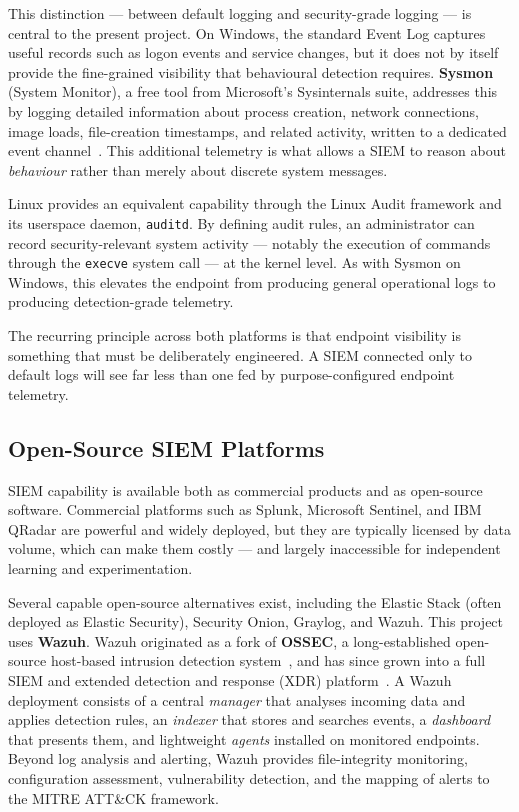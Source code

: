 This distinction --- between default logging and security-grade logging --- is
central to the present project. On Windows, the standard Event Log captures
useful records such as logon events and service changes, but it does not by
itself provide the fine-grained visibility that behavioural detection
requires. \textbf{Sysmon} (System Monitor), a free tool from Microsoft's
Sysinternals suite, addresses this by logging detailed information about
process creation, network connections, image loads, file-creation timestamps,
and related activity, written to a dedicated event channel~\cite{sysmon}. This
additional telemetry is what allows a SIEM to reason about \textit{behaviour}
rather than merely about discrete system messages.

Linux provides an equivalent capability through the Linux Audit framework and
its userspace daemon, \texttt{auditd}. By defining audit rules, an
administrator can record security-relevant system activity --- notably the
execution of commands through the \texttt{execve} system call --- at the
kernel level. As with Sysmon on Windows, this elevates the endpoint from
producing general operational logs to producing detection-grade telemetry.

The recurring principle across both platforms is that endpoint visibility is
something that must be deliberately engineered. A SIEM connected only to
default logs will see far less than one fed by purpose-configured endpoint
telemetry.

\subsection{Open-Source SIEM Platforms}

SIEM capability is available both as commercial products and as open-source
software. Commercial platforms such as Splunk, Microsoft Sentinel, and IBM
QRadar are powerful and widely deployed, but they are typically licensed by
data volume, which can make them costly --- and largely inaccessible for
independent learning and experimentation.

Several capable open-source alternatives exist, including the Elastic Stack
(often deployed as Elastic Security), Security Onion, Graylog, and Wazuh. This
project uses \textbf{Wazuh}. Wazuh originated as a fork of
\textbf{OSSEC}, a long-established open-source host-based intrusion detection
system~\cite{ossec}, and has since grown into a full SIEM and extended
detection and response (XDR) platform~\cite{wazuhdocs}. A Wazuh deployment
consists of a central \textit{manager} that analyses incoming data and applies
detection rules, an \textit{indexer} that stores and searches events, a
\textit{dashboard} that presents them, and lightweight \textit{agents}
installed on monitored endpoints. Beyond log analysis and alerting, Wazuh
provides file-integrity monitoring, configuration assessment, vulnerability
detection, and the mapping of alerts to the MITRE ATT\&CK framework.

